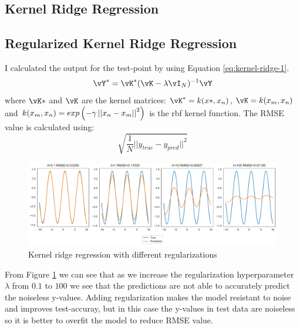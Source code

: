 \documentclass[a4paper,11pt]{article}
\begin{document}
\begin{mlsolution}

    \section{Kernel Ridge Regression}
        \subsection{Regularized Kernel Ridge Regression}
            I calculated the output for the test-point by using Equation \ref{eq:kernel-ridge-1}.
            \begin{equation}
                \label{eq:kernel-ridge-1}
                \vY^*=\vK^*(\vK-\lambda \vI_N)^{-1}\vY
            \end{equation}
            where $\vK*$ and $\vK$ are the kernel matrices: $\vK^*=k(x*,x_n)$, $\vK=k(x_m,x_n)$ and $k(x_m,x_n) = exp\left( -\gamma\left| {\left| {x_n - x_m} \right|} \right|^2 \right)$ is the rbf kernel function.
            The RMSE value is calculated using: $$\sqrt{\frac{1}{N}||y_{true} - y_{pred}|| ^2}$$
            \begin{figure}[h]
                \includegraphics[width=\textwidth]{images/kernel-ridge-regression.pdf}
                \caption{Kernel ridge regression with different regularizations}
                \label{fig:kernel-rdge-regression}
            \end{figure}
            
            From Figure \ref{fig:kernel-rdge-regression} we can see that as we increase the regularization hyperparameter $\lambda$ from $0.1$ to $100$ we see that the predictions are not able to accurately predict the noiseless y-values. Adding regularization makes the model resistant to noise and improves test-accuray, but in this case the y-values in test data are noiseless so it is better to overfit the model to reduce RMSE value.

\end{mlsolution}
\end{document}
